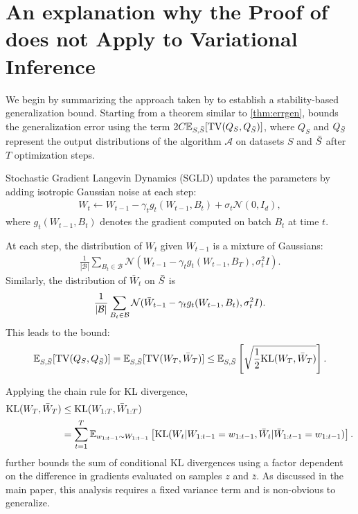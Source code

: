 \newpage
\onecolumn

\section{An explanation why the Proof of \citet{Li} does not Apply to Variational Inference}
\label{sec:Li-proof-not-for-vi}

We begin by summarizing the approach taken by \citet{Li} to establish a stability-based generalization bound. Starting from a theorem similar to \cref{thm:errgen}, \citet{Li} bounds the generalization error using the term $2C\mathbb{E}_{S, \Bar{S}} [\text{TV}(Q_S, Q_{\Bar{S}})]$, where $Q_S$ and $Q_{\Bar{S}}$ represent the output distributions of the algorithm $\mathcal{A}$ on datasets $S$ and $\Bar{S}$ after $T$ optimization steps.

Stochastic Gradient Langevin Dynamics (SGLD) updates the parameters by adding isotropic Gaussian noise at each step:
\begin{align*}
    W_t \leftarrow W_{t-1} - \gamma_t g_t(W_{t-1}, B_t) + \sigma_t \mathcal{N}(0, I_d),
\end{align*}
where $g_t(W_{t-1}, B_t)$ denotes the gradient computed on batch $B_t$ at time $t$.

At each step, the distribution of $W_t$ given $W_{t-1}$ is a mixture of Gaussians:
\begin{align*}
    \frac{1}{|\mathcal{B}|} \sum_{B_t \in \mathcal{B}} \mathcal{N}(W_{t-1} - \gamma_t g_t(W_{t-1}, B_T), \sigma_t^2 I).
\end{align*}
Similarly, the distribution of $\bar{W}_t$ on $\Bar{S}$ is
\begin{align*}
    \frac{1}{|\mathcal{B}|} \sum_{B_t \in \mathcal{B}} \mathcal{N}(\Bar{W}_{t-1} - \gamma_t g_t(W_{t-1}, B_t), \sigma_t^2 I).
\end{align*}
This leads to the bound:
\begin{align*}
    \mathbb{E}_{S, \bar{S}}[\text{TV}(Q_S, Q_{\bar{S}})] = \mathbb{E}_{S, \bar{S}}[\text{TV}(W_T, \bar{W}_T)] \leq \mathbb{E}_{S, \bar{S}}\left[\sqrt{\frac{1}{2} \text{KL}(W_T, \bar{W}_T)} \right].
\end{align*}

Applying the chain rule for KL divergence,
\begin{align}
    \text{KL}(W_T, \bar{W}_T) &\leq \text{KL}(W_{1:T}, \bar{W}_{1:T}) \\
    &= \sum_{t=1}^T \mathbb{E}_{w_{1:t-1} \sim W_{1:{t-1}}} \left[\text{KL}(W_t | W_{1:{t-1}} = w_{1:{t-1}}, \bar{W}_t | \bar{W}_{1:{t-1}} = w_{1:{t-1}}) \right]. \label{ineq:kl-chain}
\end{align}
\citet{Li} further bounds the sum of conditional KL divergences using a factor dependent on the difference in gradients evaluated on samples $z$ and $\bar{z}$. As discussed in the main paper, this analysis requires a fixed variance term and is non-obvious to generalize. 

